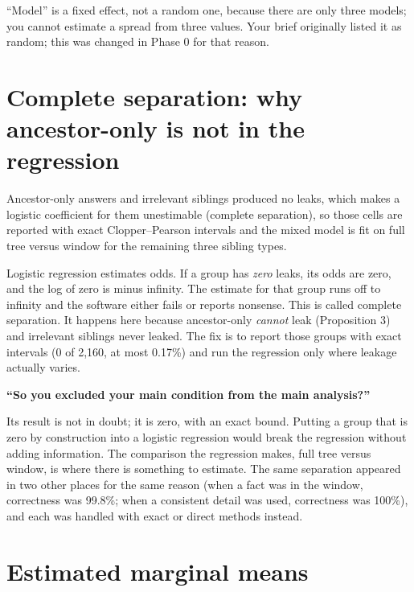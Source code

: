 \begin{why}
``Model'' is a fixed effect, not a random one, because there are only three models; you cannot estimate a spread from three values. Your brief originally listed it as random; this was changed in Phase 0 for that reason.
\end{why}

\section{Complete separation: why ancestor-only is not in the regression}

\begin{paper}
Ancestor-only answers and irrelevant siblings produced no leaks, which makes a logistic coefficient for them unestimable (complete separation), so those cells are reported with exact Clopper--Pearson intervals and the mixed model is fit on full tree versus window for the remaining three sibling types.
\end{paper}

\begin{plain}
Logistic regression estimates odds. If a group has \emph{zero} leaks, its odds are zero, and the log of zero is minus infinity. The estimate for that group runs off to infinity and the software either fails or reports nonsense. This is called complete separation. It happens here because ancestor-only \emph{cannot} leak (Proposition 3) and irrelevant siblings never leaked. The fix is to report those groups with exact intervals (0 of 2,160, at most 0.17\%) and run the regression only where leakage actually varies.
\end{plain}

\begin{ask}
\textbf{``So you excluded your main condition from the main analysis?''}\par
Its result is not in doubt; it is zero, with an exact bound. Putting a group that is zero by construction into a logistic regression would break the regression without adding information. The comparison the regression makes, full tree versus window, is where there is something to estimate. The same separation appeared in two other places for the same reason (when a fact was in the window, correctness was 99.8\%; when a consistent detail was used, correctness was 100\%), and each was handled with exact or direct methods instead.
\end{ask}

\section{Estimated marginal means}

